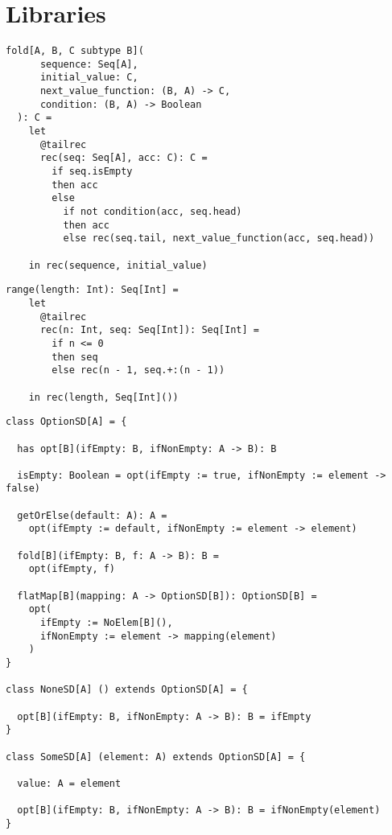 \chapter{Libraries}

\begin{lstlisting}[label={lst:foldLeftWhile}]
  fold[A, B, C subtype B](
      sequence: Seq[A],
      initial_value: C,
      next_value_function: (B, A) -> C,
      condition: (B, A) -> Boolean
  ): C =
    let
      @tailrec
      rec(seq: Seq[A], acc: C): C =
        if seq.isEmpty
        then acc
        else
          if not condition(acc, seq.head)
          then acc
          else rec(seq.tail, next_value_function(acc, seq.head))

    in rec(sequence, initial_value)
\end{lstlisting}

\begin{lstlisting}[label={lst:range}]
  range(length: Int): Seq[Int] =
    let
      @tailrec
      rec(n: Int, seq: Seq[Int]): Seq[Int] =
        if n <= 0
        then seq
        else rec(n - 1, seq.+:(n - 1))

    in rec(length, Seq[Int]())
\end{lstlisting}


\begin{lstlisting}[label={lst:option}]
class OptionSD[A] = {

  has opt[B](ifEmpty: B, ifNonEmpty: A -> B): B

  isEmpty: Boolean = opt(ifEmpty := true, ifNonEmpty := element -> false)

  getOrElse(default: A): A =
    opt(ifEmpty := default, ifNonEmpty := element -> element)

  fold[B](ifEmpty: B, f: A -> B): B =
    opt(ifEmpty, f)

  flatMap[B](mapping: A -> OptionSD[B]): OptionSD[B] =
    opt(
      ifEmpty := NoElem[B](),
      ifNonEmpty := element -> mapping(element)
    )
}

class NoneSD[A] () extends OptionSD[A] = {

  opt[B](ifEmpty: B, ifNonEmpty: A -> B): B = ifEmpty
}

class SomeSD[A] (element: A) extends OptionSD[A] = {

  value: A = element

  opt[B](ifEmpty: B, ifNonEmpty: A -> B): B = ifNonEmpty(element)
}
\end{lstlisting}

